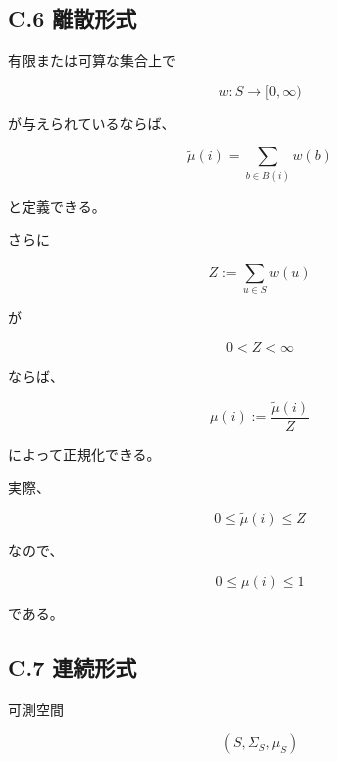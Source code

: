 \documentclass[a4paper,11pt]{article}
\begin{document}

\subsection{C.6 離散形式}

有限または可算な集合上で

\begin{equation}
    w:S\to[0,\infty)
\end{equation}

が与えられているならば、

\begin{equation}
    \widetilde\mu(i)
    =
    \sum_{b\in B(i)}w(b)
\end{equation}

と定義できる。

さらに

\begin{equation}
    Z
    :=
    \sum_{u\in S}w(u)
\end{equation}

が

\begin{equation}
    0<Z<\infty
\end{equation}

ならば、

\begin{equation}
    \mu(i)
    :=
    \frac{\widetilde\mu(i)}{Z}
\end{equation}

によって正規化できる。

実際、

\begin{equation}
    0
    \leq
    \widetilde\mu(i)
    \leq
    Z
\end{equation}

なので、

\begin{equation}
    0\leq\mu(i)\leq1
\end{equation}

である。


\subsection{C.7 連続形式}

可測空間

\begin{equation}
    (S,\Sigma_S,\mu_S)
\end{equation}
\end{document}
